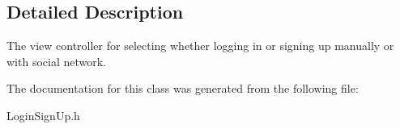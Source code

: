 \subsection{Detailed Description}
The view controller for selecting whether logging in or signing up manually or with social network. 

The documentation for this class was generated from the following file\+:\begin{DoxyCompactItemize}
\item 
Login\+Sign\+Up.\+h\end{DoxyCompactItemize}
